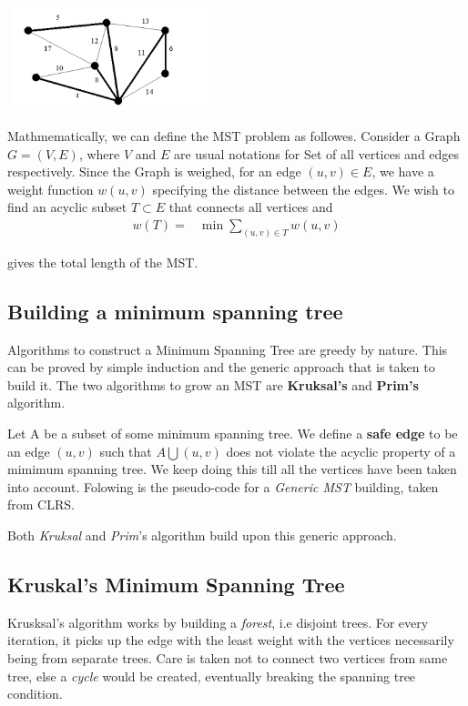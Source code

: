 \documentclass[11pt,a4paper]{extarticle}
\begin{document}
\begin{center}
	\includegraphics[width=6cm, height=3cm]{mst}
\end{center}

Mathmematically, we can define the MST problem as followes. Consider a Graph $G = (V,E)$, where $V$ and $E$ are usual notations for Set of all vertices and edges respectively. Since the Graph is weighed, for an edge $(u,v) \in E$, we have a weight function $w(u,v)$ specifying the distance between the edges. We wish to find an acyclic subset $T \subset E$ that connects all vertices and 
\begin{align}
w(T) =& \min{\sum_{(u,v) \in T} w(u,v)}
\end{align}

\noindent
gives the total length of the MST.

\subsection{Building a minimum spanning tree}
Algorithms to construct a Minimum Spanning Tree are greedy by nature. This can be proved by simple induction and the generic approach that is taken to build it. The two algorithms to grow an MST are \textbf{Kruksal's} and \textbf{Prim's} algorithm.


Let A be a subset of some minimum spanning tree. We define a \textbf{safe edge} to be an edge $(u,v)$ such that $A \bigcup {(u,v)}$ does not violate the acyclic property of a mimimum spanning tree. We keep doing this till all the vertices have been taken into account. Folowing is the pseudo-code for a \textit{Generic MST} building, taken from CLRS.

\begin{adjustwidth}{2.5em}{0pt}

\end{adjustwidth}

Both \textit{Kruksal} and \textit{Prim}'s algorithm build upon this generic approach.

\subsection{Kruskal's Minimum Spanning Tree}
Krusksal's algorithm works by building a \textit{forest}, i.e disjoint trees. For every iteration, it picks up the edge with the least weight with the vertices necessarily being from separate trees. Care is taken not to connect two vertices from same tree, else a \textit{cycle} would be created, eventually breaking the spanning tree condition.
\end{document}
